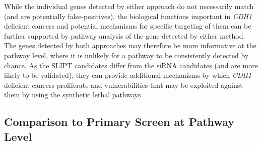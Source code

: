 While the individual genes detected by either approach do not necessarily match (and are potentially false-positives), the biological functions important in \textit{CDH1} deficient cancers and potential mechanisms for specific targeting of them can be further supported by pathway analysis of the gene detected by either method. The genes detected by both approaches may therefore be more informative at the pathway level, where it is unlikely for a pathway to be consistently detected by chance. As the \gls{SLIPT} candidates differ from the siRNA candidates (and are more likely to be validated), they can provide additional mechanisms by which \textit{CDH1} deficient cancers proliferate and vulnerabilities that may be exploited against them by using the synthetic lethal pathways.

\FloatBarrier

\subsection{Comparison to Primary Screen at Pathway Level}  \label{chapt3:compare_pathway}

